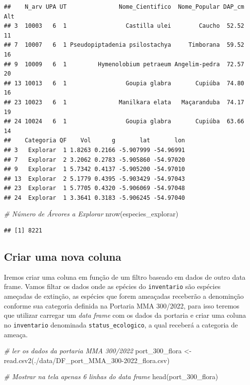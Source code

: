 \documentclass[
]{article}
\newenvironment{Shaded}{\begin{snugshade}}{\end{snugshade}}
\newcommand{\CommentTok}[1]{\textcolor[rgb]{0.56,0.35,0.01}{\textit{#1}}}
\newcommand{\FunctionTok}[1]{\textcolor[rgb]{0.00,0.00,0.00}{#1}}
\newcommand{\NormalTok}[1]{#1}
\newcommand{\OtherTok}[1]{\textcolor[rgb]{0.56,0.35,0.01}{#1}}
\newcommand{\StringTok}[1]{\textcolor[rgb]{0.31,0.60,0.02}{#1}}
\begin{document}
\begin{verbatim}
##    N_arv UPA UT               Nome_Cientifico  Nome_Popular DAP_cm Alt
## 3  10003   6  1                 Castilla ulei        Caucho  52.52  11
## 7  10007   6  1 Pseudopiptadenia psilostachya     Timborana  59.52  16
## 9  10009   6  1         Hymenolobium petraeum Angelim-pedra  72.57  20
## 13 10013   6  1                 Goupia glabra       Cupiúba  74.80  16
## 23 10023   6  1               Manilkara elata   Maçaranduba  74.17  19
## 24 10024   6  1                 Goupia glabra       Cupiúba  63.66  14
##    Categoria QF    Vol      g       lat       lon
## 3   Explorar  1 1.8263 0.2166 -5.907999 -54.96991
## 7   Explorar  2 3.2062 0.2783 -5.905860 -54.97020
## 9   Explorar  1 5.7342 0.4137 -5.905200 -54.97010
## 13  Explorar  2 5.1779 0.4395 -5.903429 -54.97043
## 23  Explorar  1 5.7705 0.4320 -5.906069 -54.97048
## 24  Explorar  1 3.3641 0.3183 -5.906245 -54.97040
\end{verbatim}

\begin{Shaded}
\begin{Highlighting}[]
\CommentTok{\# Número de Árvores a Explorar}
\FunctionTok{nrow}\NormalTok{(especies\_explorar)}
\end{Highlighting}
\end{Shaded}

\begin{verbatim}
## [1] 8221
\end{verbatim}

\hypertarget{criar-uma-nova-coluna}{%
\subsection{Criar uma nova coluna}\label{criar-uma-nova-coluna}}

Iremos criar uma coluna em função de um filtro baseado em dados de outro
data frame. Vamos filtar os dados onde as epécies do \texttt{inventario}
são espécies ameçadas de extinção, as espécies que forem ameaçadas
receberão a denominção conforme sua categoria definida na Portaria MMA
300/2022, para isso teremos que utilizar carregar um \emph{data frame}
com os dados da portaria e criar uma coluna no \texttt{inventario}
denominada \texttt{status\_ecologico}, a qual receberá a categoria de
ameaça.

\begin{Shaded}
\begin{Highlighting}[]
\CommentTok{\# ler os dados da portaria MMA 300/2022}
\NormalTok{port\_300\_flora }\OtherTok{\textless{}{-}} \FunctionTok{read.csv2}\NormalTok{(}\StringTok{\textquotesingle{}./data/DF\_port\_MMA\_300{-}2022\_flora.csv\textquotesingle{}}\NormalTok{)}

\CommentTok{\# Mostrar na tela apenas 6 linhas do data frame}
\FunctionTok{head}\NormalTok{(port\_300\_flora)}
\end{Highlighting}
\end{Shaded}
\end{document}
